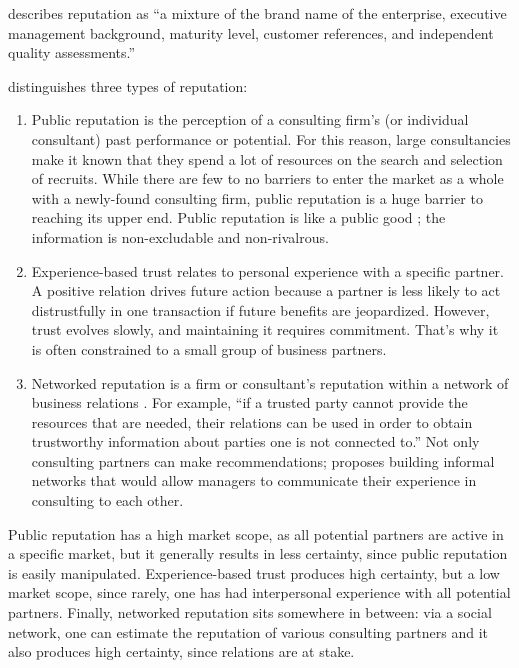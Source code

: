 \documentclass[12pt]{article}
\providecommand{\tightlist}{%
  \setlength{\itemsep}{0pt}\setlength{\parskip}{0pt}}
\begin{document}
\citet[193]{kirilov2012} describes reputation as ``a mixture of the
brand name of the enterprise, executive management background, maturity
level, customer references, and independent quality assessments.''

\citet[75-76]{armbruster2006} distinguishes three types of reputation:

\begin{enumerate}
\def\labelenumi{\arabic{enumi}.}
\tightlist
\item
  Public reputation is the perception of a consulting firm's (or
  individual consultant) past performance or potential. For this reason,
  large consultancies make it known that they spend a lot of resources
  on the search and selection of recruits. \citep[ 91]{kieser2006} While
  there are few to no barriers to enter the market as a whole with a
  newly-found consulting firm, public reputation is a huge barrier to
  reaching its upper end. Public reputation is like a public good ; the
  information is non-excludable and non-rivalrous.
\item
  Experience-based trust relates to personal experience with a specific
  partner. A positive relation drives future action because a partner is
  less likely to act distrustfully in one transaction if future benefits
  are jeopardized. \citep[ 367]{shapiro1992} However, trust evolves
  slowly, and maintaining it requires commitment. That's why it is often
  constrained to a small group of business partners.
\item
  Networked reputation is a firm or consultant's reputation within a
  network of business relations \citep[ 271]{gluckler2003}. For example,
  ``if a trusted party cannot provide the resources that are needed,
  their relations can be used in order to obtain trustworthy information
  about parties one is not connected to.'' \citep[ 280]{gluckler2003}
  Not only consulting partners can make recommendations;
  \citet[308]{honer2006} proposes building informal networks that would
  allow managers to communicate their experience in consulting to each
  other.
\end{enumerate}

Public reputation has a high market scope, as all potential partners are
active in a specific market, but it generally results in less certainty,
since public reputation is easily manipulated. Experience-based trust
produces high certainty, but a low market scope, since rarely, one has
had interpersonal experience with all potential partners. Finally,
networked reputation sits somewhere in between: via a social network,
one can estimate the reputation of various consulting partners and it
also produces high certainty, since relations are at stake.
\end{document}
